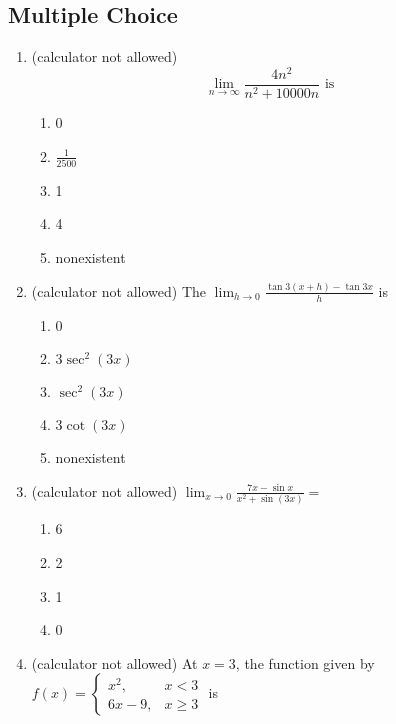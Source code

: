 \documentclass[
]{article}
\author{}
\date{}
\providecommand{\tightlist}{%
  \setlength{\itemsep}{0pt}\setlength{\parskip}{0pt}}
\begin{document}
\subsection{Multiple Choice}\label{multiple-choice}

\begin{enumerate}
\def\labelenumi{\arabic{enumi}.}
\tightlist
\item
  (calculator not allowed)
  \[\lim _{n \rightarrow \infty} \frac{4 n^{2}}{n^{2}+10000 n} \text { is }\]

  \begin{enumerate}
  \def\labelenumii{(\alph{enumii})}
  \tightlist
  \item
    0
  \item
    \(\frac{1}{2500}\)
  \item
    1
  \item
    4
  \item
    nonexistent
  \end{enumerate}
\item
  (calculator not allowed) The
  \(\lim _{h \rightarrow 0} \frac{\tan 3(x+h)-\tan 3 x}{h}\) is

  \begin{enumerate}
  \def\labelenumii{(\alph{enumii})}
  \tightlist
  \item
    0
  \item
    \(3 \sec ^{2}(3 x)\)
  \item
    \(\sec ^{2}(3 x)\)
  \item
    \(3 \cot (3 x)\)
  \item
    nonexistent
  \end{enumerate}
\item
  (calculator not allowed)
  \(\lim _{x \rightarrow 0} \frac{7 x-\sin x}{x^{2}+\sin (3 x)}=\)

  \begin{enumerate}
  \def\labelenumii{(\alph{enumii})}
  \tightlist
  \item
    6
  \item
    2
  \item
    1
  \item
    0
  \end{enumerate}
\item
  (calculator not allowed) At \(x=3\), the function given by
  \(f(x)=\left\{\begin{array}{cc}x^{2}, & x<3 \\ 6 x-9, & x \geq 3\end{array}\right.\)
  is


\end{enumerate}
\end{document}

